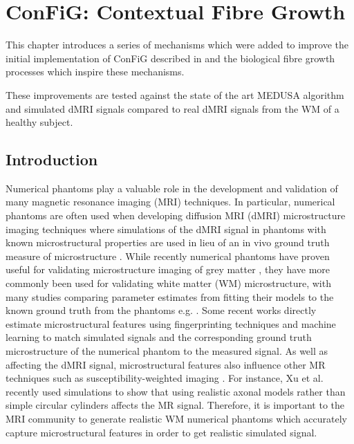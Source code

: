 \chapter{ConFiG: Contextual Fibre Growth}
\label{chap:config}

\chaptertoc{}

\begin{chapterabstract}
  This chapter introduces a series of mechanisms which were added to improve the initial implementation of ConFiG described in  and the biological fibre growth processes which inspire these mechanisms.

  These improvements are tested against the state of the art MEDUSA algorithm and simulated \ac{dMRI} signals compared to real \ac{dMRI} signals from the \acl{WM} of a healthy subject.
\end{chapterabstract}

\section{Introduction}
\label{sec:config_introduction}
Numerical phantoms play a valuable role in the development and validation of many magnetic resonance imaging (MRI) techniques.
In particular, numerical phantoms are often used when developing diffusion MRI (dMRI) microstructure imaging techniques where simulations of the dMRI signal in phantoms with known microstructural properties are used in lieu of an in vivo ground truth measure of microstructure \cite{Alexander2017}.
While recently numerical phantoms have proven useful for validating microstructure imaging of grey matter \cite{Palombo2020}, they have more commonly been used for validating white matter (WM) microstructure, with many studies comparing parameter estimates from fitting their models to the known ground truth from the phantoms e.g. \cite{Li2019,Jelescu2017,Scherrer2016,Tariq2016,Daducci2015,Nilsson2017,Xu2014,Zhang2012,Nilsson2010}.
Some recent works directly estimate microstructural features using fingerprinting techniques and machine learning to match simulated signals and the corresponding ground truth microstructure of the numerical phantom to the measured signal\cite{Hill2019,Palombo2018a,Rensonnet2018,Nedjati-Gilani2017}.
As well as affecting the dMRI signal, microstructural features also influence other MR techniques such as susceptibility-weighted imaging \cite{Li2012,Lee2010}.
For instance, Xu et al. \cite{Xu2018} recently used simulations to show that using realistic axonal models rather than simple circular cylinders affects the MR signal.
Therefore, it is important to the MRI community to generate realistic WM numerical phantoms which accurately capture microstructural features in order to get realistic simulated signal.

